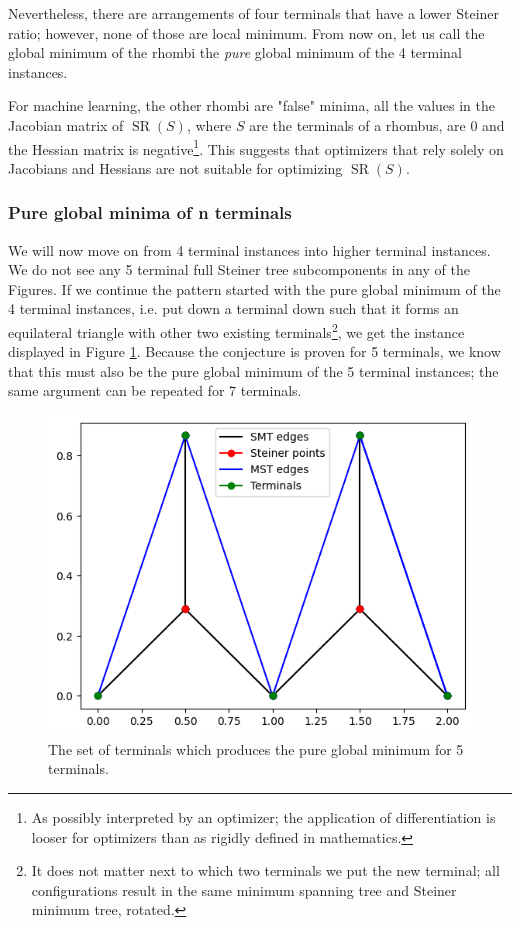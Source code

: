 \documentclass{mpaper}
\begin{document}
Nevertheless, there are arrangements of four terminals that have a lower Steiner ratio; however, none of those are local minimum. From now on, let us call the global minimum of the rhombi the  \emph{pure} global minimum of the 4 terminal instances. 

For machine learning, the other rhombi are "false" minima, all the values in the Jacobian matrix of $\operatorname{SR}(S)$, where $S$ are the terminals of a rhombus, are 0 and the Hessian matrix is negative\footnote{As possibly interpreted by an optimizer; the application of differentiation is looser for optimizers than as rigidly defined in mathematics.}. This suggests that optimizers that rely solely on Jacobians and Hessians are not suitable for optimizing $\operatorname{SR}(S)$.

\subsubsection{Pure global minima of n terminals}
We will now move on from 4 terminal instances into higher terminal instances. We do not see any 5 terminal full Steiner tree subcomponents in any of the Figures. If we continue the pattern started with the pure global minimum of the 4 terminal instances, i.e. put down a terminal down such that it forms an equilateral triangle with other two existing terminals\footnote{It does not matter next to which two terminals we put the new terminal; all configurations result in the same minimum spanning tree and Steiner minimum tree, rotated.}, we get the instance displayed in Figure \ref{fig:13}. Because the conjecture is proven for 5 terminals, we know that this must also be the pure global minimum of the 5 terminal instances; the same argument can be repeated for 7 terminals.

\begin{figure}[h!]
  \begin{center}
  \includegraphics[scale=0.5]{plot12.png}
  \end{center}
  \caption{\label{fig:13} The set of terminals which produces the pure global minimum for 5 terminals.}
\end{figure}
\end{document}
